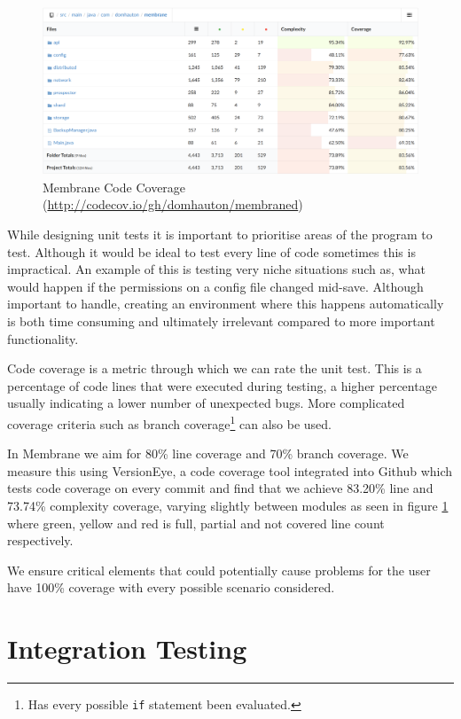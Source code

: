 \documentclass[11pt, a4paper, twoside]{report}
\def\code#1{\texttt{#1}}
\begin{document}
\begin{figure}[!ht]
 \centering
 \includegraphics[width=\textwidth]{code-coverage}
 \caption{Membrane Code Coverage (\url{http://codecov.io/gh/domhauton/membraned})}
 \label{fig:code-coverage}
\end{figure}

While designing unit tests it is important to prioritise areas of the program to test. Although it would be ideal to test every line of code sometimes this is impractical. An example of this is testing very niche situations such as, what would happen if the permissions on a config file changed mid-save. Although important to handle, creating an environment where this happens automatically is both time consuming and ultimately irrelevant compared to more important functionality.

Code coverage is a metric through which we can rate the unit test. This is a percentage of code lines that were executed during testing, a higher percentage usually indicating a lower number of unexpected bugs. \citep{miller1963systematic} More complicated coverage criteria such as branch coverage\footnote{Has every possible \code{if} statement been evaluated.} can also be used.

In Membrane we aim for 80\% line coverage and 70\% branch coverage. We measure this using VersionEye, a code coverage tool integrated into Github which tests code coverage on every commit and find that we achieve 83.20\% line and 73.74\% complexity coverage, varying slightly between modules as seen in figure \ref{fig:code-coverage} where green, yellow and red is full, partial and not covered line count respectively.

We ensure critical elements that could potentially cause problems for the user have 100\% coverage with every possible scenario considered.

\section{Integration Testing}
\end{document}
